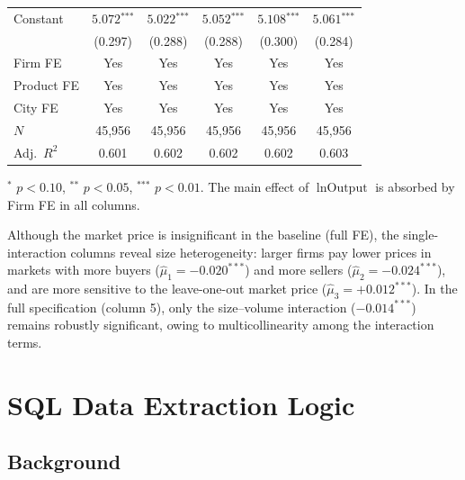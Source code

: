 \documentclass[12pt]{article}
\newcommand{\sym}[1]{\ensuremath{^{\text{#1}}}}
\newcommand{\se}[1]{{\small(#1)}}
\begin{document}
\begin{landscape}
\begin{table}[H]
\begin{threeparttable}
\begin{tabular}{lccccc}
      Constant & \(5.072\sym{***}\) & \(5.022\sym{***}\) & \(5.052\sym{***}\) & \(5.108\sym{***}\) & \(5.061\sym{***}\) \\
               & \se{0.297} & \se{0.288} & \se{0.288} & \se{0.300} & \se{0.284} \\
      \midrule
      Firm FE    & Yes & Yes & Yes & Yes & Yes \\
      Product FE & Yes & Yes & Yes & Yes & Yes \\
      City FE    & Yes & Yes & Yes & Yes & Yes \\
      \(N\)      & 45,956 & 45,956 & 45,956 & 45,956 & 45,956 \\
      Adj.\ \(R^2\) & 0.601 & 0.602 & 0.602 & 0.602 & 0.603 \\
      \bottomrule
    \end{tabular}
    \begin{tablenotes}[flushleft]
      \footnotesize
      \item \sym{*} \(p<0.10\), \sym{**} \(p<0.05\), \sym{***} \(p<0.01\).
        The main effect of \(\ln\text{Output}\) is absorbed by Firm FE in all
        columns.
      \item Although the market price is insignificant in the baseline (full FE),
        the single-interaction columns reveal size heterogeneity: larger firms
        pay lower prices in markets with more buyers
        (\(\hat\mu_1 = -0.020^{***}\)) and more sellers
        (\(\hat\mu_2 = -0.024^{***}\)), and are more sensitive to the
        leave-one-out market price (\(\hat\mu_3 = +0.012^{***}\)). In the full
        specification (column 5), only the size--volume interaction
        (\(-0.014^{***}\)) remains robustly significant, owing to
        multicollinearity among the interaction terms.
    \end{tablenotes}
  \end{threeparttable}
\end{table}
\end{landscape}

\section{SQL Data Extraction Logic}
\label{sec:sql}

\subsection*{Background}
\end{document}
